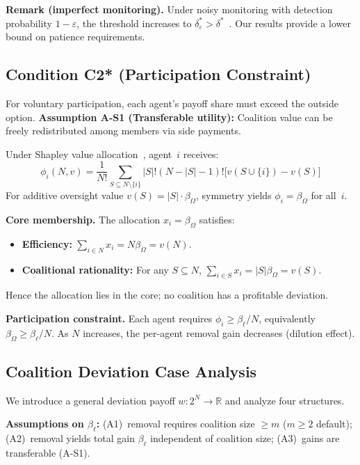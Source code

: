 \documentclass[11pt]{article}
\begin{document}
\textbf{Remark (imperfect monitoring).} Under noisy monitoring with detection probability $1 - \varepsilon$, the threshold increases to $\delta^*_\varepsilon > \delta^*$~\cite{green.porter.1984}. Our results provide a lower bound on patience requirements.

\subsection{Condition C2* (Participation Constraint)}
\label{sec:S4.3}

For voluntary participation, each agent's payoff share must exceed the outside option. \textbf{Assumption A-S1 (Transferable utility):} Coalition value can be freely redistributed among members via side payments.

Under Shapley value allocation~\cite{shapley.1953}, agent~$i$ receives:
\begin{equation}
\phi_i(N,v) = \frac{1}{N!}\sum_{S \subseteq N \setminus \{i\}} |S|!(N-|S|-1)!\bigl[v(S \cup \{i\}) - v(S)\bigr]
\end{equation}
For additive oversight value $v(S) = |S| \cdot \beta_\Omega$, symmetry yields $\phi_i = \beta_\Omega$ for all~$i$.

\textbf{Core membership.} The allocation $x_i = \beta_\Omega$ satisfies:
\begin{itemize}
\item \textbf{Efficiency:} $\sum_{i \in N} x_i = N \beta_\Omega = v(N)$.
\item \textbf{Coalitional rationality:} For any $S \subseteq N$, $\sum_{i \in S} x_i = |S| \beta_\Omega = v(S)$.
\end{itemize}
Hence the allocation lies in the core; no coalition has a profitable deviation.

\textbf{Participation constraint.} Each agent requires $\phi_i \geq \beta_\ell/N$, equivalently $\beta_\Omega \geq \beta_\ell/N$. As $N$ increases, the per-agent removal gain decreases (dilution effect).

\subsection{Coalition Deviation Case Analysis}
\label{sec:S4.4}

We introduce a general deviation payoff $w: 2^N \to \mathbb{R}$ and analyze four structures.

\textbf{Assumptions on $\beta_\ell$:} (A1)~removal requires coalition size $\geq m$ ($m \geq 2$ default); (A2)~removal yields total gain $\beta_\ell$ independent of coalition size; (A3)~gains are transferable (A-S1).
\end{document}
